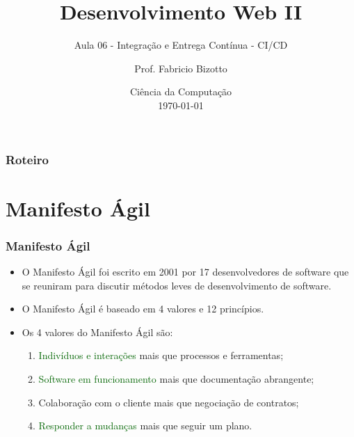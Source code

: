 \documentclass[
	9pt, %
	t, %
]{beamer}
\title[DesWebII]{Desenvolvimento Web II} %
\subtitle{Aula 06 - Integração e Entrega Contínua - CI/CD} %
\author[Fabricio Bizotto]{Prof. Fabricio Bizotto} %
\institute[IFC]{Instituto Federal Catarinense \\ \smallskip \textit{fabricio.bizotto@ifc.edu.br}} %
\date[\today]{Ciência da Computação \\ \today} %
\begin{document}

\begin{frame}
	\titlepage %
\end{frame}


\begin{frame}
	\frametitle{Roteiro} %
	
	\tableofcontents %
\end{frame}


\section{Manifesto Ágil}


\begin{frame}
	\frametitle{Manifesto Ágil}
	\begin{itemize}
		\item O Manifesto Ágil foi escrito em 2001 por 17 desenvolvedores de software que se reuniram para discutir métodos leves de desenvolvimento de software.
		\item O Manifesto Ágil é baseado em 4 valores e 12 princípios.
		\item Os 4 valores do Manifesto Ágil são:
		\begin{enumerate}
			\item \textcolor{darkgreen}{Indivíduos e interações} mais que processos e ferramentas;
			\item \textcolor{darkgreen}{Software em funcionamento} mais que documentação abrangente;
			\item Colaboração com o cliente mais que negociação de contratos;
			\item \textcolor{darkgreen}{Responder a mudanças} mais que seguir um plano.
		\end{enumerate}
	\end{itemize}
\end{frame}
\end{document}
